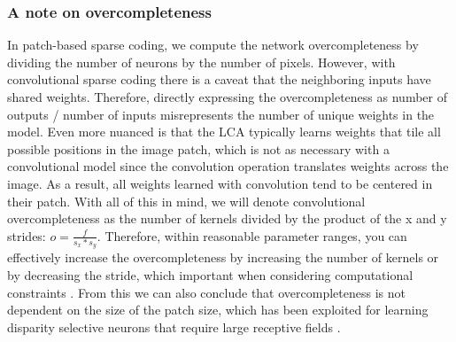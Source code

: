 \subsubsection{A note on overcompleteness}
In patch-based sparse coding, we compute the network overcompleteness by dividing the number of neurons by the number of pixels. However, with convolutional sparse coding there is a caveat that the neighboring inputs have shared weights. Therefore, directly expressing the overcompleteness as number of outputs / number of inputs misrepresents the number of unique weights in the model. Even more nuanced is that the LCA typically learns weights that tile all possible positions in the image patch, which is not as necessary with a convolutional model since the convolution operation translates weights across the image. As a result, all weights learned with convolution tend to be centered in their patch. With all of this in mind, we will denote convolutional overcompleteness as the number of kernels divided by the product of the x and y strides: $o = \tfrac{f}{s_{x}*s_{y}}$. Therefore, within reasonable parameter ranges, you can effectively increase the overcompleteness by increasing the number of kernels or by decreasing the stride, which important when considering computational constraints \parencite{schultz2014replicating}. From this we can also conclude that overcompleteness is not dependent on the size of the patch size, which has been exploited for learning disparity selective neurons that require large receptive fields \parencite{lundquist2016sparse}.


